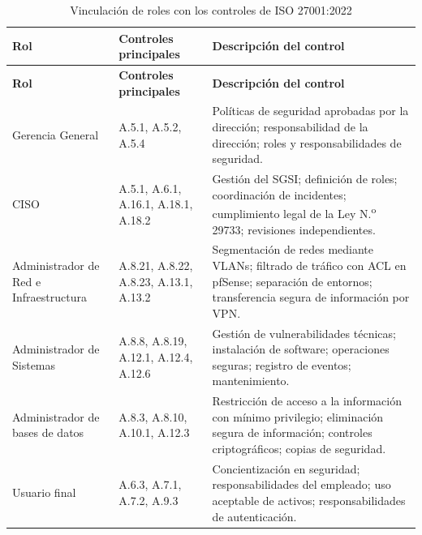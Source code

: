 \documentclass[11pt, a4paper, oneside]{report}
\begin{document}
\begin{xltabular}{\textwidth}{@{}|L{3.6cm}|L{3cm}|X|@{}}
\caption{Vinculación de roles con los controles de ISO 27001:2022}
\label{tab:vinculacion_roles_iso27001} \\

\parbox[c][1.1cm][c]{\linewidth}{\centering\color{white}\bfseries\small Rol} &
\parbox[c][1.1cm][c]{\linewidth}{\centering\color{white}\bfseries\small Controles principales} &
\parbox[c][1.1cm][c]{\linewidth}{\centering\color{white}\bfseries\small Descripción del control} \\ \hline
\endfirsthead

\parbox[c][1.1cm][c]{\linewidth}{\centering\color{white}\bfseries\small Rol} &
\parbox[c][1.1cm][c]{\linewidth}{\centering\color{white}\bfseries\small Controles principales} &
\parbox[c][1.1cm][c]{\linewidth}{\centering\color{white}\bfseries\small Descripción del control} \\ \hline
\endhead

\hline
\endfoot

{\small Gerencia General} & {\small A.5.1, A.5.2, A.5.4} & {\small Políticas de seguridad aprobadas por la dirección; responsabilidad de la dirección; roles y responsabilidades de seguridad.} \\ \hline
{\small CISO} & {\small A.5.1, A.6.1, A.16.1, A.18.1, A.18.2} & {\small Gestión del SGSI; definición de roles; coordinación de incidentes; cumplimiento legal de la Ley N.\textsuperscript{o} 29733; revisiones independientes.} \\ \hline
{\small Administrador de Red e Infraestructura} & {\small A.8.21, A.8.22, A.8.23, A.13.1, A.13.2} & {\small Segmentación de redes mediante VLANs; filtrado de tráfico con ACL en pfSense; separación de entornos; transferencia segura de información por VPN.} \\ \hline
{\small Administrador de Sistemas} & {\small A.8.8, A.8.19, A.12.1, A.12.4, A.12.6} & {\small Gestión de vulnerabilidades técnicas; instalación de software; operaciones seguras; registro de eventos; mantenimiento.} \\ \hline
{\small Administrador de bases de datos} & {\small A.8.3, A.8.10, A.10.1, A.12.3} & {\small Restricción de acceso a la información con mínimo privilegio; eliminación segura de información; controles criptográficos; copias de seguridad.} \\ \hline
{\small Usuario final} & {\small A.6.3, A.7.1, A.7.2, A.9.3} & {\small Concientización en seguridad; responsabilidades del empleado; uso aceptable de activos; responsabilidades de autenticación.} \\ \hline

\end{xltabular}
\end{document}
